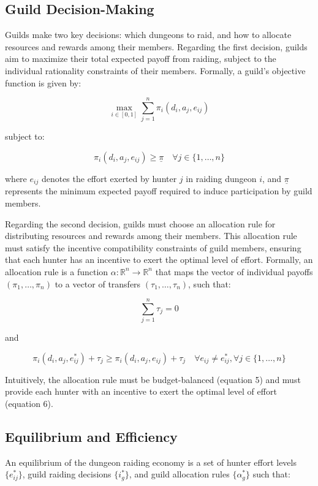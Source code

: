 \documentclass[12pt, a4paper]{article}
\begin{document}
\subsection{Guild Decision-Making}
Guilds make two key decisions: which dungeons to raid, and how to allocate resources and rewards among their members. Regarding the first decision, guilds aim to maximize their total expected payoff from raiding, subject to the individual rationality constraints of their members. Formally, a guild's objective function is given by:

\begin{equation}
\max_{i \in [0,1]} \sum_{j=1}^n \pi_i(d_i, a_j, e_{ij})
\end{equation}

subject to:

\begin{equation}
\pi_i(d_i, a_j, e_{ij}) \geq \underline{\pi} \quad \forall j \in \{1, \ldots, n\}
\end{equation}

where $e_{ij}$ denotes the effort exerted by hunter $j$ in raiding dungeon $i$, and $\underline{\pi}$ represents the minimum expected payoff required to induce participation by guild members.

Regarding the second decision, guilds must choose an allocation rule for distributing resources and rewards among their members. This allocation rule must satisfy the incentive compatibility constraints of guild members, ensuring that each hunter has an incentive to exert the optimal level of effort. Formally, an allocation rule is a function $\alpha: \mathbb{R}^n \rightarrow \mathbb{R}^n$ that maps the vector of individual payoffs $(\pi_1, \ldots, \pi_n)$ to a vector of transfers $(\tau_1, \ldots, \tau_n)$, such that:

\begin{equation}
\sum_{j=1}^n \tau_j = 0
\end{equation}

and

\begin{equation}
\pi_i(d_i, a_j, e_{ij}^*) + \tau_j \geq \pi_i(d_i, a_j, e_{ij}) + \tau_j \quad \forall e_{ij} \neq e_{ij}^*, \forall j \in \{1, \ldots, n\}
\end{equation}

Intuitively, the allocation rule must be budget-balanced (equation 5) and must provide each hunter with an incentive to exert the optimal level of effort (equation 6).

\subsection{Equilibrium and Efficiency}
An equilibrium of the dungeon raiding economy is a set of hunter effort levels $\{e_{ij}^*\}$, guild raiding decisions $\{i_g^*\}$, and guild allocation rules $\{\alpha_g^*\}$ such that:
\end{document}
